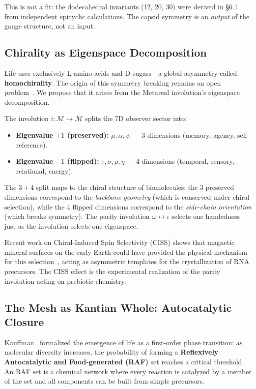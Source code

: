 This is not a fit: the dodecahedral invariants (12, 20, 30) were derived in \S6.1 from independent epicyclic calculations. The capsid symmetry is an \emph{output} of the gauge structure, not an input.

\subsection{Chirality as Eigenspace Decomposition}

Life uses exclusively L-amino acids and D-sugars---a global asymmetry called \textbf{homochirality}. The origin of this symmetry breaking remains an open problem~\cite{blackmond2024}. We propose that it arises from the Metareal involution's eigenspace decomposition.

The involution $i: \mathcal{M} \to \mathcal{M}$ splits the 7D observer sector into:
\begin{itemize}
    \item \textbf{Eigenvalue $+1$ (preserved):} $\mu, \alpha, \psi$ --- 3 dimensions (memory, agency, self-reference).
    \item \textbf{Eigenvalue $-1$ (flipped):} $\tau, \sigma, \rho, \eta$ --- 4 dimensions (temporal, sensory, relational, energy).
\end{itemize}

The $3 + 4$ split maps to the chiral structure of biomolecules: the 3 preserved dimensions correspond to the \emph{backbone geometry} (which is conserved under chiral selection), while the 4 flipped dimensions correspond to the \emph{side-chain orientation} (which breaks symmetry). The parity involution $\omega \leftrightarrow \iota$ selects one handedness just as the involution selects one eigenspace.

Recent work on Chiral-Induced Spin Selectivity (CISS) shows that magnetic mineral surfaces on the early Earth could have provided the physical mechanism for this selection~\cite{tassinari2019}, acting as asymmetric templates for the crystallization of RNA precursors. The CISS effect is the experimental realization of the parity involution acting on prebiotic chemistry.

\subsection{The Mesh as Kantian Whole: Autocatalytic Closure}

Kauffman~\cite{kauffman2024} formalized the emergence of life as a first-order phase transition: as molecular diversity increases, the probability of forming a \textbf{Reflexively Autocatalytic and Food-generated (RAF)} set reaches a critical threshold. An RAF set is a chemical network where every reaction is catalyzed by a member of the set and all components can be built from simple precursors.


